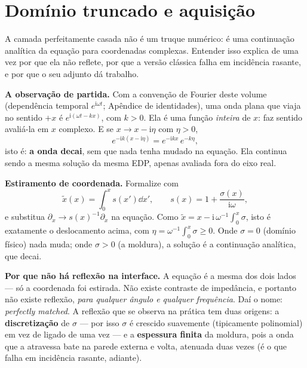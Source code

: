 \documentclass[11pt,a4paper,oneside]{report}
\begin{document}
\chapter{Dom\'inio truncado e aquisi\c{c}\~ao}
\label{cap:bordas}

\begin{ideia}
A camada perfeitamente casada n\~ao \'e um truque num\'erico: \'e uma
continua\c{c}\~ao anal\'itica da equa\c{c}\~ao para coordenadas complexas.
Entender isso explica de uma vez por que ela n\~ao reflete, por que a vers\~ao
cl\'assica falha em incid\^encia rasante, e por que o seu adjunto d\'a
trabalho.
\end{ideia}

\begin{matematica}
\textbf{A observa\c{c}\~ao de partida.} Com a conven\c{c}\~ao de Fourier deste
volume (depend\^encia temporal $e^{\mathrm{i}\omega t}$; Ap\^endice de
identidades), uma onda plana que viaja no sentido $+x$ \'e
$e^{\mathrm{i}(\omega t - kx)}$, com $k>0$. Ela \'e uma fun\c{c}\~ao
\emph{inteira} de $x$: faz sentido avali\'a-la em $x$ complexo. E se
$x \to x - \mathrm{i}\eta$ com $\eta > 0$,
\[
e^{-\mathrm{i}k(x-\mathrm{i}\eta)} = e^{-\mathrm{i}kx}\,e^{-k\eta},
\]
isto \'e: \textbf{a onda decai}, sem que nada tenha mudado na equa\c{c}\~ao.
Ela continua sendo a mesma solu\c{c}\~ao da mesma EDP, apenas avaliada fora do
eixo real.

\textbf{Estiramento de coordenada.} Formalize com
\[
\tilde x(x) = \int_0^{x} s(x')\dd x',
\qquad
s(x) = 1 + \frac{\sigma(x)}{\mathrm{i}\omega},
\]
e substitua $\partial_x \to s(x)^{-1}\partial_x$ na equa\c{c}\~ao. Como
$\tilde x = x - \mathrm{i}\,\omega^{-1}\!\int_0^x\sigma$, isto \'e exatamente
o deslocamento acima, com $\eta = \omega^{-1}\!\int_0^x\sigma \ge 0$. Onde
$\sigma = 0$ (dom\'inio f\'isico) nada muda; onde $\sigma > 0$ (a moldura), a
solu\c{c}\~ao \'e a continua\c{c}\~ao anal\'itica, que decai.

\textbf{Por que n\~ao h\'a reflex\~ao na interface.} A equa\c{c}\~ao \'e a
mesma dos dois lados --- s\'o a coordenada foi estirada. N\~ao existe
contraste de imped\^ancia, e portanto n\~ao existe reflex\~ao, \emph{para
qualquer \^angulo e qualquer frequ\^encia}. Da\'i o nome: \emph{perfectly
matched}. A reflex\~ao que se observa na pr\'atica tem duas origens: a
\textbf{discretiza\c{c}\~ao} de $\sigma$ --- por isso $\sigma$ \'e crescido
suavemente (tipicamente polinomial) em vez de ligado de uma vez --- e a
\textbf{espessura finita} da moldura, pois a onda que a atravessa bate na
parede externa e volta, atenuada duas vezes (\'e o que falha em incid\^encia
rasante, adiante).
\end{matematica}
\end{document}

